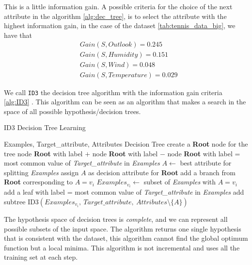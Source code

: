 \documentclass[10pt, letterpaper]{report}
\begin{document}
This is a little information gain. A possible criteria for the choice of the next attribute in the algorithm \ref{alg:dec_tree}, is to select the attribute with the highest information gain, in the case of the dataset \ref{tab:tennis_data_big}, we have that\begin{align}
	 & Gain(S,Outlook)=0.245     \\
	 & Gain(S,Humidity)=0.151    \\
	 & Gain(S,Wind)=0.048        \\
	 & Gain(S,Temperature)=0.029
\end{align}

\bigskip
\noindent We call \texttt{ID3} the decision tree algorithm with the information gain criteria \ref{alg:ID3} . This algorithm can be seen as an algorithm that makes a search in the space of all possible hypothesis/decision trees.

\bigskip
\begin{algorithm}
	\caption{ID3 Decision Tree Learning}\label{alg:ID3}
	\begin{algorithmic}
		\Require Examples, Target\_attribute, Attributes
		\Ensure Decision Tree
		\State create a \textbf{Root} node for the tree
		\State \Return node \textbf{Root} with label $+$
		\State \Return node \textbf{Root} with label $-$
		\State \Return node \textbf{Root} with label = most common value of \textit{Target\_attribute} in \textit{Examples}
		\Else
		\State $A \leftarrow$ best attribute for splitting \textit{Examples}
		\State assign $A$ as decision attribute for \textbf{Root}
		\State add a branch from \textbf{Root} corresponding to $A = v_i$
		\State $Examples_{v_i} \leftarrow$ subset of \textit{Examples} with $A = v_i$
		\State add a leaf with label = most common value of \textit{Target\_attribute} in \textit{Examples}
		\Else
		\State add subtree $\text{ID3}(Examples_{v_i}, \ Target\_attribute, \ Attributes \setminus \{A\})$
		\EndIf
		\EndFor
		\EndIf
	\end{algorithmic}
\end{algorithm}

\bigskip
The hypothesis space of decision trees is \textit{complete}, and we can represent all possible subsets of the input space. The algorithm returns one single hypothesis that is consistent with the dataset, this algorithm cannot find the global optimum function but a local minima.
This algorithm is not incremental and uses all the training set at each step.
\end{document}
